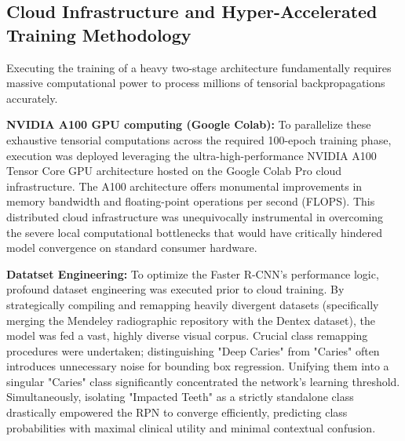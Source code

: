 \subsection{Cloud Infrastructure and Hyper-Accelerated Training Methodology}
\par Executing the training of a heavy two-stage architecture fundamentally requires massive computational power to process millions of tensorial backpropagations accurately. 
\par \textbf{NVIDIA A100 GPU computing (Google Colab):} To parallelize these exhaustive tensorial computations across the required 100-epoch training phase, execution was deployed leveraging the ultra-high-performance NVIDIA A100 Tensor Core GPU architecture hosted on the Google Colab Pro cloud infrastructure. The A100 architecture offers monumental improvements in memory bandwidth and floating-point operations per second (FLOPS). This distributed cloud infrastructure was unequivocally instrumental in overcoming the severe local computational bottlenecks that would have critically hindered model convergence on standard consumer hardware.
\par \textbf{Datatset Engineering:} To optimize the Faster R-CNN's performance logic, profound dataset engineering was executed prior to cloud training. By strategically compiling and remapping heavily divergent datasets (specifically merging the Mendeley radiographic repository with the Dentex dataset), the model was fed a vast, highly diverse visual corpus. Crucial class remapping procedures were undertaken; distinguishing "Deep Caries" from "Caries" often introduces unnecessary noise for bounding box regression. Unifying them into a singular "Caries" class significantly concentrated the network's learning threshold. Simultaneously, isolating "Impacted Teeth" as a strictly standalone class drastically empowered the RPN to converge efficiently, predicting class probabilities with maximal clinical utility and minimal contextual confusion.

